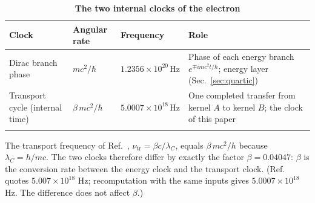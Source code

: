 \documentclass[%
 reprint, amsmath,amssymb, aps, prb, ]{revtex4-2}
\numberwithin{equation}{section}
\begin{document}
\begin{table}[t!]
\centering
\caption{\textbf{The two internal clocks of the electron}}
\label{tab:clocks}
\renewcommand{\arraystretch}{1.4}
\begin{tabular}{p{3.6cm}p{3.4cm}p{3.0cm}p{5.5cm}}
\toprule
\textbf{Clock} & \textbf{Angular rate} & \textbf{Frequency} & \textbf{Role} \\
\midrule
Dirac branch phase
& $mc^2/\hbar$
& $1.2356\times10^{20}\,\mathrm{Hz}$
& Phase of each energy branch $e^{\mp imc^2t/\hbar}$; energy layer (Sec.~\ref{sec:quartic}) \\
\addlinespace[0.3cm]
Transport cycle (internal time)
& $\beta\,mc^2/\hbar$
& $5.0007\times10^{18}\,\mathrm{Hz}$
& One completed transfer from kernel $A$ to kernel $B$; the clock of this paper \\
\addlinespace[0.2cm]
\bottomrule
\end{tabular}
\vspace{0.2cm}
\begin{minipage}{0.95\textwidth}
\justifying\footnotesize
The transport frequency of Ref.~\cite{ref:p10}, $\nu_{\mathrm{tr}}=\beta c/\lambda_C$, equals $\beta\,mc^2/h$ because $\lambda_C=h/mc$. The two clocks therefore differ by exactly the factor $\beta=0.04047$: $\beta$ is the conversion rate between the energy clock and the transport clock. (Ref.~\cite{ref:p10} quotes $5.007\times10^{18}$ Hz; recomputation with the same inputs gives $5.0007\times10^{18}$ Hz. The difference does not affect $\beta$.)
\end{minipage}
\end{table}
\end{document}
